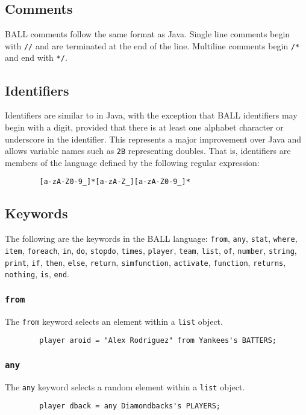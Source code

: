 \subsection{Comments}
BALL comments follow the same format as Java. Single line comments begin with \texttt{//} and are terminated at the end of the line. Multiline comments begin \texttt{/*} and end with \texttt{*/}.
\subsection{Identifiers}
Identifiers are similar to in Java, with the exception that BALL identifiers may begin with a digit, provided that there is at least one alphabet character or underscore in the identifier. This represents a major improvement over Java and allows variable names such as \texttt{2B} representing doubles. That is, identifiers are members of the language defined by the following regular expression: 
\begin{verbatim}
        [a-zA-Z0-9_]*[a-zA-Z_][a-zA-Z0-9_]*
\end{verbatim}

\subsection{Keywords} \label{keywords}
The following are the keywords in the BALL language: \texttt{from}, \texttt{any}, \texttt{stat}, \texttt{where}, \texttt{item}, \texttt{foreach}, \texttt{in}, \texttt{do}, \texttt{stopdo}, \texttt{times}, \texttt{player}, \texttt{team}, \texttt{list}, \texttt{of},  \texttt{number}, \texttt{string}, \texttt{print}, \texttt{if}, \texttt{then}, \texttt{else}, \texttt{return}, \texttt{simfunction}, \texttt{activate}, \texttt{function}, \texttt{returns}, \texttt{nothing}, \texttt{is}, \texttt{end}.
\subsubsection{\texttt{from}}
The \texttt{from} keyword selects an element within a \texttt{list} object. 
\begin{verbatim}
        player aroid = "Alex Rodriguez" from Yankees's BATTERS;
\end{verbatim}

\subsubsection{\texttt{any}}
The \texttt{any} keyword selects a random element within a \texttt{list} object.
\begin{verbatim}
        player dback = any Diamondbacks's PLAYERS;
\end{verbatim}

